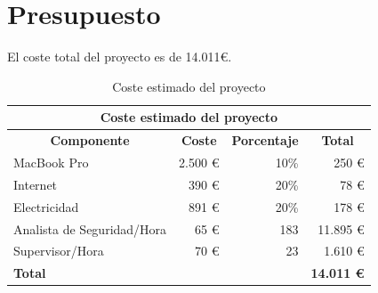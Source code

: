 \documentclass[a4paper,12pt]{article}
\begin{document}
\section{Presupuesto}
El coste total del proyecto es de 14.011\euro.
\begin{table}[H]
	\centering
	\begin{tabular}{@{}lrrr@{}}
		\toprule
		\multicolumn{4}{c}{{Coste estimado del proyecto}} \\ \midrule
		\multicolumn{1}{c}{\textbf{Componente}} & \multicolumn{1}{c}{\textbf{Coste}} & \multicolumn{1}{c}{\textbf{Porcentaje}} & \multicolumn{1}{c}{\textbf{Total}} \\
		MacBook Pro & 2.500 \euro & 10\% & 250 \euro \\
		Internet & 390 \euro & 20\% & 78 \euro \\
		Electricidad & 891 \euro & 20\% & 178 \euro \\
		Analista de Seguridad/Hora & 65 \euro & 183 & 11.895 \euro \\
		Supervisor/Hora & 70 \euro & 23 & 1.610 \euro \\
		\multicolumn{3}{l}{\textbf{Total}} & \textbf{14.011 \euro} \\ \bottomrule
	\end{tabular}
	\caption{Coste estimado del proyecto}
	\label{tab:table2}
\end{table}

\end{document}
